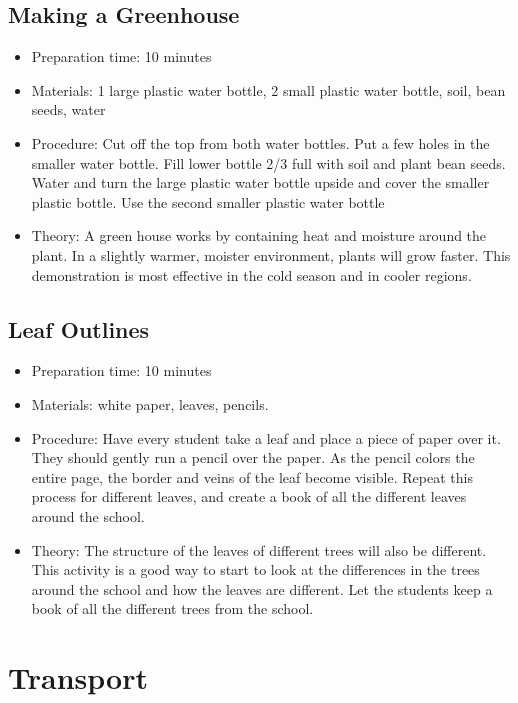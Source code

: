 \subsection{Making a Greenhouse}
\begin{itemize}
\item{Preparation time: 10 minutes}
\item{Materials: 1 large plastic water bottle, 2 small plastic water bottle, soil, bean seeds, water}
\item{Procedure: Cut off the top from both water bottles. Put a few holes in the smaller water bottle. Fill lower bottle 2/3 full with soil and plant bean seeds. Water and turn the large plastic water bottle upside and cover the smaller plastic bottle. Use the second smaller plastic water bottle}
\item{Theory: A green house works by containing heat and moisture around the plant. In a slightly warmer, moister environment, plants will grow faster. This demonstration is most effective in the cold season and in cooler regions.}
\end{itemize}

\subsection{Leaf Outlines}
\begin{itemize}
\item{Preparation time: 10 minutes}
\item{Materials: white paper, leaves, pencils.}
\item{Procedure: Have every student take a leaf and place a piece of paper over it. They should gently run a pencil over the paper. As the pencil colors the entire page, the border and veins of the leaf become visible. Repeat this process for different leaves, and create a book of all the different leaves around the school.}
\item{Theory: The structure of the leaves of different trees will also be different. This activity is a good way to start to look at the differences in the trees around the school and how the leaves are different. Let the students keep a book of all the different trees from the school.}
\end{itemize}

\section{Transport}

